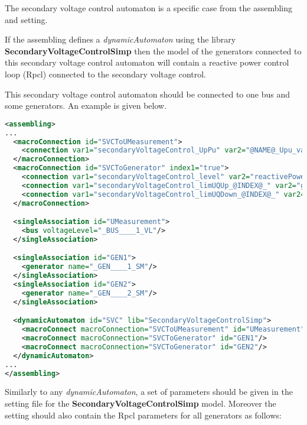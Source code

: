 \documentclass[a4paper, 12pt]{report}
\begin{document}
The secondary voltage control automaton is a specific case from the assembling and setting.

If the assembling defines a \textit{dynamicAutomaton} using the library \textbf{SecondaryVoltageControlSimp} then the model of the generators connected to
this secondary voltage control automaton will contain a reactive power control loop (Rpcl) connected to the secondary voltage control.

This secondary voltage control automaton should be connected to one bus and some generators.
An example is given below.

\begin{lstlisting}[language=XML, breaklines=true, breakatwhitespace=false, columns=fullflexible]
<assembling>
...
  <macroConnection id="SVCToUMeasurement">
    <connection var1="secondaryVoltageControl_UpPu" var2="@NAME@_Upu_value"/>
  </macroConnection>
  <macroConnection id="SVCToGenerator" index1="true">
    <connection var1="secondaryVoltageControl_level" var2="reactivePowerControlLoop_level"/>
    <connection var1="secondaryVoltageControl_limUQUp_@INDEX@_" var2="generator_limUQUp"/>
    <connection var1="secondaryVoltageControl_limUQDown_@INDEX@_" var2="generator_limUQDown"/>
  </macroConnection>

  <singleAssociation id="UMeasurement">
    <bus voltageLevel="_BUS____1_VL"/>
  </singleAssociation>

  <singleAssociation id="GEN1">
    <generator name="_GEN____1_SM"/>
  </singleAssociation>
  <singleAssociation id="GEN2">
    <generator name="_GEN____2_SM"/>
  </singleAssociation>

  <dynamicAutomaton id="SVC" lib="SecondaryVoltageControlSimp">
    <macroConnect macroConnection="SVCToUMeasurement" id="UMeasurement"/>
    <macroConnect macroConnection="SVCToGenerator" id="GEN1"/>
    <macroConnect macroConnection="SVCToGenerator" id="GEN2"/>
  </dynamicAutomaton>
...
</assembling>
\end{lstlisting}


Similarly to any \textit{dynamicAutomaton}, a set of parameters should be given in the setting file for the \textbf{SecondaryVoltageControlSimp} model.
Moreover the setting should also contain the Rpcl parameters for all generators as follows:
\end{document}
